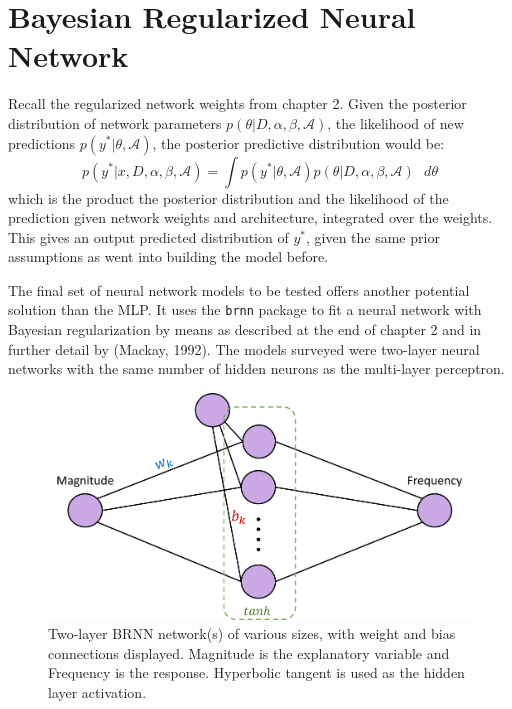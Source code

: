 \section{Bayesian Regularized Neural Network}

Recall the regularized network weights from chapter 2. Given the posterior distribution of network parameters $p(\theta|D,\alpha,\beta,\mathcal{A})$, the likelihood of new predictions $p(y^*|\theta,\mathcal{A})$, the posterior predictive distribution would be:
$$
p(y^*|x,D,\alpha,\beta,\mathcal{A}) = \int p(y^*|\theta,\mathcal{A}) p(\theta|D,\alpha,\beta,\mathcal{A}) \text{ } d\theta
$$
which is the product the posterior distribution and the likelihood of the prediction given network weights and architecture, integrated over the weights.  This gives an output predicted distribution of $y^*$, given the same prior assumptions as went into building the model before.

The final set of neural network models to be tested offers another potential solution than the MLP.  It uses the \texttt{brnn} package \cite{brnn} to fit a neural network with Bayesian regularization by means as described at the end of chapter 2 and in further detail by (Mackay, 1992).
The models surveyed were two-layer neural networks with the same number of hidden neurons as the multi-layer perceptron.

\begin{figure}[H]
    \center
    \includegraphics[width=0.55\linewidth]{Figures/BRNNdiag.png}
    \caption{\footnotesize{Two-layer BRNN network(s) of various sizes, with weight and bias connections displayed.  Magnitude is the explanatory variable and Frequency is the response.  Hyperbolic tangent is used as the hidden layer activation.}}
    \label{BRNNdiag}
\end{figure}

